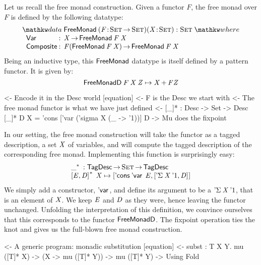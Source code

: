 \newcommand{\FMFreeMonad}{\D{FreeMonad}}
\newcommand{\FMFreeMonadD}{\D{FreeMonadD}}
\newcommand{\FMVar}{\C{Var}}
\newcommand{\FMComposite}{\C{Composite}}

Let us recall the free monad construction. Given a functor $F$, the
free monad over $F$ is defined by the following datatype:
%
\[
\stk{
\data \FMFreeMonad\: \PITEL{\V{F}}{\Set \To \Set} 
                     \PITEL{\V{X}}{\Set} :
                     \Set 
\where \\
\;\;\begin{array}{@{}l@{\::\:\:}l@{\quad}l}
    \FMVar           & \V{X} \To \FMFreeMonad\: \V{F}\: \V{X}                            \\
    \FMComposite     & \V{F} (\FMFreeMonad\: \V{F}\: \V{X}) \To \FMFreeMonad\: \V{F}\: \V{X}    
\end{array}
}
\]
%
Being an inductive type, this $\FMFreeMonad$ datatype is itself
defined by a pattern functor. It is given by:
%
\[
\FMFreeMonadD\: \V{F}\: \V{X}\: \V{Z} \mapsto \V{X} \mathop{\D{+}} \V{F} \V{Z}
\]

\begin{wstructure}
    <- Encode it in the Desc world [equation]
        <- F is the Desc we start with
        <- The free monad functor is what we have just defined
        <- [\_]* : Desc -> Set -> Desc
           [\_]* D X = 'cons ['var ('sigma X (\_ -> '1))] D
        -> Mu does the fixpoint
\end{wstructure}

In our setting, the free monad construction will take the functor as a
tagged description, a set $\V{X}$ of variables, and will compute the
tagged description of the corresponding free monad. Implementing this
function is surprisingly easy:
%
\[\stk{
\FreeMonad{\_} : \TagDesc \To \Set \To \TagDesc \\
\FreeMonad{\pair{\V{E}}{\V{D}}{}}\:\V{X} \mapsto
    \pair{\ListCons{\DVar{}}{\V{E}}}
         {\pair{\DSigma{\V{X}}{\DUnit}}{\V{D}}{}}{}
}\]
%
We simply add a constructor, $\DVar{\!}$, and define its argument to
be a $\DSigma{\V{X}}{\DUnit}$, that is an element of $\V{X}$. We keep
$\V{E}$ and $\V{D}$ as they were, hence leaving the functor
unchanged. Unfolding the interpretation of this definition, we
convince ourselves that this corresponds to the functor
$\FMFreeMonadD$. The fixpoint operation ties the knot and gives us
the full-blown free monad construction.

\begin{wstructure}
<- A generic program: monadic substitution [equation]
    <- subst : \forall T X Y. mu ([T]* X) -> (X -> mu ([T]* Y)) -> mu ([T]* Y)
        -> Using Fold
\end{wstructure}

